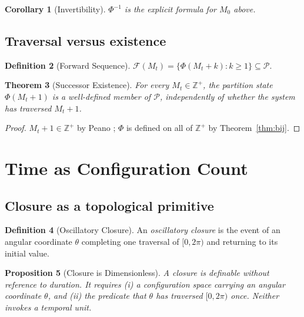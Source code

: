 \documentclass[twocolumn,10pt,a4paper]{article}
\theoremstyle{thmstyle}
\newtheorem{theorem}{Theorem}[section]
\newtheorem{proposition}[theorem]{Proposition}
\newtheorem{corollary}[theorem]{Corollary}
\theoremstyle{definition}
\newtheorem{definition}[theorem]{Definition}
\theoremstyle{remark}
\newcommand{\Zp}{\mathbb{Z}^{+}}
\newcommand{\Parts}{\mathcal{P}}
\newcommand{\PhiMap}{\varPhi}
\newcommand{\calF}{\mathcal{F}}
\begin{document}
\begin{corollary}[Invertibility]
\label{cor:inv}
$\PhiMap^{-1}$ is the explicit formula for $M_{0}$ above.
\end{corollary}

\subsection{Traversal versus existence}

\begin{definition}[Forward Sequence]
\label{def:forward}
$\calF(M_{t})=\{\PhiMap(M_{t}+k):k\geq 1\}\subseteq\Parts$.
\end{definition}

\begin{theorem}[Successor Existence]
\label{thm:succ}
For every $M_{t}\in\Zp$, the partition state $\PhiMap(M_{t}+1)$ is a
well-defined member of $\Parts$, independently of whether the system
has traversed $M_{t}+1$.
\end{theorem}

\begin{proof}
$M_{t}+1\in\Zp$ by Peano \citep{peano1889}; $\PhiMap$ is defined on
all of $\Zp$ by Theorem~\ref{thm:bij}.
\end{proof}

\section{Time as Configuration Count}
\label{sec:timecount}

\subsection{Closure as a topological primitive}

\begin{definition}[Oscillatory Closure]
\label{def:closure}
An \emph{oscillatory closure} is the event of an angular coordinate
$\theta$ completing one traversal of $[0,2\pi)$ and returning to its
initial value.
\end{definition}

\begin{proposition}[Closure is Dimensionless]
\label{prop:closure}
A closure is definable without reference to duration. It requires (i)
a configuration space carrying an angular coordinate $\theta$, and
(ii) the predicate that $\theta$ has traversed $[0,2\pi)$ once.
Neither invokes a temporal unit.
\end{proposition}
\end{document}
